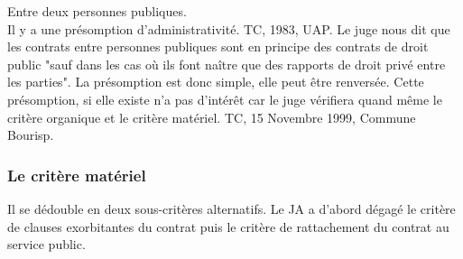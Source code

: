 \documentclass[10pt, a4paper, openany]{book}
\begin{document}
Entre deux personnes publiques. \\
Il y a une présomption d'administrativité. TC, 1983, UAP. Le juge nous dit que les contrats entre personnes publiques sont en principe des contrats de droit public "sauf dans les cas où ils font naître que des rapports de droit privé entre les parties". La présomption est donc simple, elle peut être renversée. Cette présomption, si elle existe n'a pas d'intérêt car le juge vérifiera quand même le critère organique et le critère matériel. TC, 15 Novembre 1999, Commune Bourisp. 

\subsubsection{Le critère matériel}

Il se dédouble en deux sous-critères alternatifs. Le JA a d'abord dégagé le critère de clauses exorbitantes du contrat puis le critère de rattachement du contrat au service public. 
\end{document}
